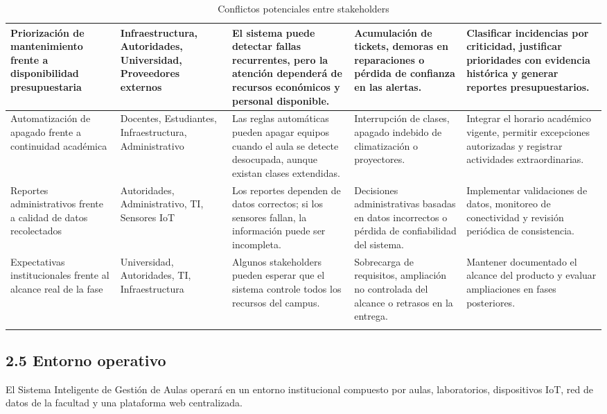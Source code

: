 \begin{longtable}{|p{3.1cm}|p{3.1cm}|p{3.1cm}|p{3.1cm}|p{3.1cm}|}
Priorización de mantenimiento frente a disponibilidad presupuestaria & Infraestructura, Autoridades, Universidad, Proveedores externos & El sistema puede detectar fallas recurrentes, pero la atención dependerá de recursos económicos y personal disponible. & Acumulación de tickets, demoras en reparaciones o pérdida de confianza en las alertas. & Clasificar incidencias por criticidad, justificar prioridades con evidencia histórica y generar reportes presupuestarios. \\ \hline
Automatización de apagado frente a continuidad académica & Docentes, Estudiantes, Infraestructura, Administrativo & Las reglas automáticas pueden apagar equipos cuando el aula se detecte desocupada, aunque existan clases extendidas. & Interrupción de clases, apagado indebido de climatización o proyectores. & Integrar el horario académico vigente, permitir excepciones autorizadas y registrar actividades extraordinarias. \\ \hline
Reportes administrativos frente a calidad de datos recolectados & Autoridades, Administrativo, TI, Sensores IoT & Los reportes dependen de datos correctos; si los sensores fallan, la información puede ser incompleta. & Decisiones administrativas basadas en datos incorrectos o pérdida de confiabilidad del sistema. & Implementar validaciones de datos, monitoreo de conectividad y revisión periódica de consistencia. \\ \hline
Expectativas institucionales frente al alcance real de la fase & Universidad, Autoridades, TI, Infraestructura & Algunos stakeholders pueden esperar que el sistema controle todos los recursos del campus. & Sobrecarga de requisitos, ampliación no controlada del alcance o retrasos en la entrega. & Mantener documentado el alcance del producto y evaluar ampliaciones en fases posteriores. \\ \hline
\caption{Conflictos potenciales entre stakeholders}
\end{longtable}
\endgroup

\subsection*{2.5 Entorno operativo}


El Sistema Inteligente de Gestión de Aulas operará en un entorno institucional compuesto por aulas, laboratorios, dispositivos IoT, red de datos de la facultad y una plataforma web centralizada.


